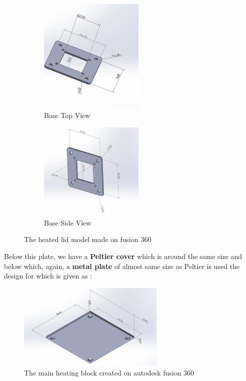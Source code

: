 \documentclass[12pt]{article}
\begin{document}
\begin{figure}[htp]
    \centering
    \begin{subfigure}[b]{0.4\textwidth}
    \centering
    \includegraphics[width=5cm]{Images/Isolation_Base.png}
    \caption{Base Top View}
    \end{subfigure}
    \hfill
    \begin{subfigure}[b]{0.5\textwidth}
    \centering
    \includegraphics[width=5cm]{Images/Peltierbase2.jpeg}
    \caption{Base Side View}
    \end{subfigure}
    \caption{The heated lid model made on fusion 360}
    \label{fig:galaxy}
\end{figure}




Below this plate, we have a \textbf{Peltier cover} which is around the same size and below which, again, a \textbf{metal plate} of almost same size as Peltier is used the design for which is given as :

\begin{figure}[h]
    \centering
    \includegraphics[width=7cm]{Images/peltierbase.jpeg}
    \caption{The main heating block created on autodesk fusion 360}
    \label{fig:galaxy}
\end{figure}
\end{document}
